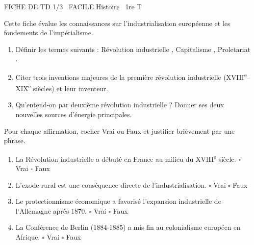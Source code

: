 \documentclass[11pt]{article}
\begin{document}
\begin{tcolorbox}[enhanced,colback=popink,colframe=popink,arc=10pt,boxrule=0pt,left=12pt,right=12pt,top=9pt,bottom=9pt]
{\color{white}\popxbold\small FICHE DE TD 1/3 \textbullet\ FACILE \hfill Histoire \textbullet\ 1re T\par}
\end{tcolorbox}
\vspace{4pt}
Cette fiche évalue les connaissances sur l'industrialisation européenne et les fondements de l'impérialisme.

\begin{exercice}
\begin{enumerate}
    \item Définir les termes suivants : \og Révolution industrielle \fg, \og Capitalisme \fg, \og Proletariat \fg.
    \item Citer trois inventions majeures de la première révolution industrielle (XVIII\textsuperscript{e}–XIX\textsuperscript{e} siècles) et leur inventeur.
    \item Qu'entend-on par \og deuxième révolution industrielle \fg ? Donner ses deux nouvelles sources d'énergie principales.
\end{enumerate}
\end{exercice}

\begin{exercice}
Pour chaque affirmation, cocher Vrai ou Faux et justifier brièvement par une phrase.
\begin{enumerate}
    \item La Révolution industrielle a débuté en France au milieu du XVIII\textsuperscript{e} siècle. \hfill $\square$ Vrai \quad $\square$ Faux
    \item L'exode rural est une conséquence directe de l'industrialisation. \hfill $\square$ Vrai \quad $\square$ Faux
    \item Le protectionnisme économique a favorisé l'expansion industrielle de l'Allemagne après 1870. \hfill $\square$ Vrai \quad $\square$ Faux
    \item La Conférence de Berlin (1884-1885) a mis fin au colonialisme européen en Afrique. \hfill $\square$ Vrai \quad $\square$ Faux
\end{enumerate}
\end{exercice}
\end{document}
